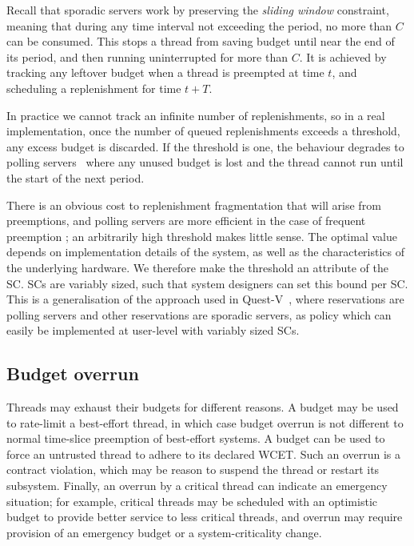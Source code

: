 Recall that sporadic servers work by preserving the
\emph{sliding window} constraint, meaning that during any time
interval not exceeding the period, no more than $C$ can be consumed.
This stops a thread from saving budget until near the end of its
period, and then running uninterrupted for more than $C$. It is achieved by tracking any leftover
budget when
a thread is preempted at time \(t\), and scheduling a replenishment for time  $t+T$.

In practice we cannot track an infinite number of
replenishments, so in a real implementation, once the number of
queued replenishments exceeds a threshold, any excess budget is
discarded. If the threshold is one, the behaviour degrades to polling
servers~\citep{Sprunt_SL_89a} where any unused budget is lost and the
thread cannot run until the start of the next period.

There is an obvious cost to replenishment fragmentation that will
arise from preemptions, and polling servers are more efficient in the
case of frequent preemption \citep{Li_WCM_14}; an arbitrarily high
threshold makes little sense. The optimal value depends on
implementation details of the system, as well as the characteristics
of the underlying hardware.
We therefore make the threshold an attribute of the SC. \glspl{SC} are variably sized,
such that system designers can set this bound per SC. This is a generalisation of the approach used
in Quest-V~\citep{Danish_LW_11}, where \IO reservations are polling servers and other reservations 
are sporadic servers, as policy which can easily be implemented at user-level with variably sized
\glspl{SC}.

\subsection{Budget overrun}\label{s:timeout}

Threads may exhaust their budgets for different reasons. A budget may
be used to rate-limit a best-effort thread, in which case budget
overrun is not different to normal time-slice preemption of
best-effort systems. A budget can be used to force an untrusted thread
to adhere to its declared WCET. Such an overrun is a contract violation, which may be reason
to suspend the thread or restart its subsystem. Finally, an overrun by
a critical thread can indicate an emergency situation; for example,
critical threads may be scheduled with an optimistic budget to provide
better service to less critical threads, and overrun may require
provision of an emergency budget or a system-criticality change.

